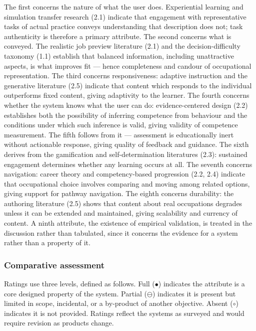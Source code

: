 The first concerns the nature of what the user does. Experiential learning and simulation transfer research (2.1) indicate that engagement with representative tasks of actual practice conveys understanding that description does not; task authenticity is therefore a primary attribute. The second concerns what is conveyed. The realistic job preview literature (2.1) and the decision-\allowbreak{}difficulty taxonomy (1.1) establish that balanced information, including unattractive aspects, is what improves fit --- hence completeness and candour of occupational representation. The third concerns responsiveness: adaptive instruction and the generative literature (2.5) indicate that content which responds to the individual outperforms fixed content, giving adaptivity to the learner. The fourth concerns whether the system knows what the user can do: evidence-\allowbreak{}centered design (2.2) establishes both the possibility of inferring competence from behaviour and the conditions under which such inference is valid, giving validity of competence measurement. The fifth follows from it --- assessment is educationally inert without actionable response, giving quality of feedback and guidance. The sixth derives from the gamification and self-\allowbreak{}determination literatures (2.3): sustained engagement determines whether any learning occurs at all. The seventh concerns navigation: career theory and competency-\allowbreak{}based progression (2.2, 2.4) indicate that occupational choice involves comparing and moving among related options, giving support for pathway navigation. The eighth concerns durability: the authoring literature (2.5) shows that content about real occupations degrades unless it can be extended and maintained, giving scalability and currency of content. A ninth attribute, the existence of empirical validation, is treated in the discussion rather than tabulated, since it concerns the evidence for a system rather than a property of it.

\subsubsection{Comparative assessment}

Ratings use three levels, defined as follows. Full ($\bullet$) indicates the attribute is a core designed property of the system. Partial ($\ominus$) indicates it is present but limited in scope, incidental, or a by-product of another objective. Absent ($\circ$) indicates it is not provided. Ratings reflect the systems as surveyed and would require revision as products change.

